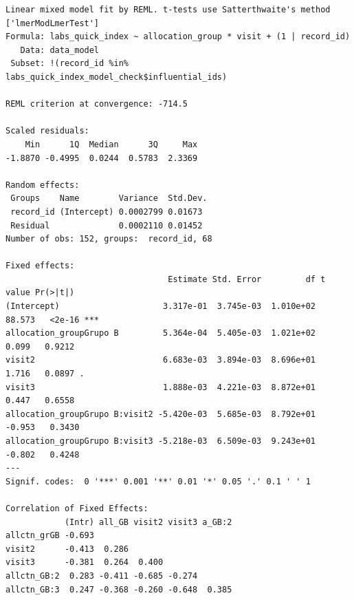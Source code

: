 \documentclass[
  12pt,
]{article}
\newenvironment{Shaded}{\begin{snugshade}}{\end{snugshade}}
\newcommand{\NormalTok}[1]{\textcolor[rgb]{0.00,0.23,0.31}{#1}}
\newcommand{\SpecialCharTok}[1]{\textcolor[rgb]{0.37,0.37,0.37}{#1}}
\begin{document}
\begin{verbatim}
Linear mixed model fit by REML. t-tests use Satterthwaite's method ['lmerModLmerTest']
Formula: labs_quick_index ~ allocation_group * visit + (1 | record_id)
   Data: data_model
 Subset: !(record_id %in% labs_quick_index_model_check$influential_ids)

REML criterion at convergence: -714.5

Scaled residuals: 
    Min      1Q  Median      3Q     Max 
-1.8870 -0.4995  0.0244  0.5783  2.3369 

Random effects:
 Groups    Name        Variance  Std.Dev.
 record_id (Intercept) 0.0002799 0.01673 
 Residual              0.0002110 0.01452 
Number of obs: 152, groups:  record_id, 68

Fixed effects:
                                 Estimate Std. Error         df t value Pr(>|t|)    
(Intercept)                     3.317e-01  3.745e-03  1.010e+02  88.573   <2e-16 ***
allocation_groupGrupo B         5.364e-04  5.405e-03  1.021e+02   0.099   0.9212    
visit2                          6.683e-03  3.894e-03  8.696e+01   1.716   0.0897 .  
visit3                          1.888e-03  4.221e-03  8.872e+01   0.447   0.6558    
allocation_groupGrupo B:visit2 -5.420e-03  5.685e-03  8.792e+01  -0.953   0.3430    
allocation_groupGrupo B:visit3 -5.218e-03  6.509e-03  9.243e+01  -0.802   0.4248    
---
Signif. codes:  0 '***' 0.001 '**' 0.01 '*' 0.05 '.' 0.1 ' ' 1

Correlation of Fixed Effects:
            (Intr) all_GB visit2 visit3 a_GB:2
allctn_grGB -0.693                            
visit2      -0.413  0.286                     
visit3      -0.381  0.264  0.400              
allctn_GB:2  0.283 -0.411 -0.685 -0.274       
allctn_GB:3  0.247 -0.368 -0.260 -0.648  0.385
\end{verbatim}

\begin{Shaded}
\end{Shaded}
\end{document}
